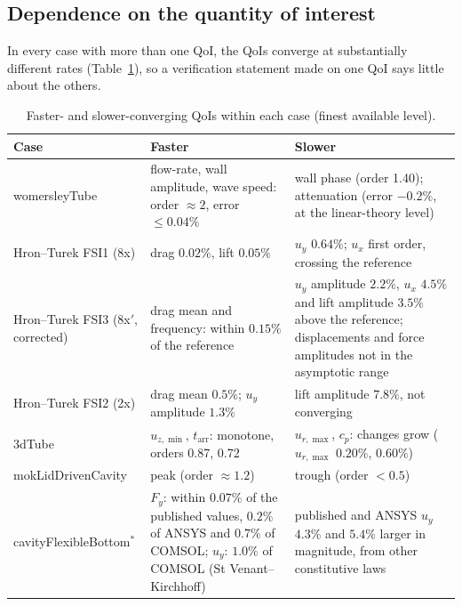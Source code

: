 \subsection{Dependence on the quantity of interest}\label{sec:qoi_dependence}

In every case with more than one QoI, the QoIs converge at substantially different rates (Table~\ref{tab:qoi_dependence}), so a verification statement made on one QoI says little about the others.

\begin{table}[htbp]
	\centering
	\footnotesize
	\setlength{\tabcolsep}{3pt}
	\caption{Faster- and slower-converging QoIs within each case (finest available level).}
	\label{tab:qoi_dependence}
	\begin{tabular}{p{2.8cm}p{5.4cm}p{5.4cm}}
		\toprule
		Case & Faster & Slower \\
		\midrule
		womersleyTube & flow-rate, wall amplitude, wave speed: order $\approx2$, error $\leq0.04\%$ & wall phase (order 1.40); attenuation (error $-0.2\%$, at the linear-theory level) \\
		Hron--Turek FSI1 (8x) & drag $0.02\%$, lift $0.05\%$ & $u_y$ $0.64\%$; $u_x$ first order, crossing the reference \\
		Hron--Turek FSI3 (8x$'$, corrected) & drag mean and frequency: within $0.15\%$ of the reference & $u_y$ amplitude $2.2\%$, $u_x$ $4.5\%$ and lift amplitude $3.5\%$ above the reference; displacements and force amplitudes not in the asymptotic range \\
		Hron--Turek FSI2 (2x) & drag mean $0.5\%$; $u_y$ amplitude $1.3\%$ & lift amplitude $7.8\%$, not converging \\
		3dTube & $u_{z,\min}$, $t_\mathrm{arr}$: monotone, orders 0.87, 0.72 & $u_{r,\max}$, $c_p$: changes grow ($u_{r,\max}$ $0.20\%$, $0.60\%$) \\
		mokLidDrivenCavity & peak (order $\approx1.2$) & trough (order $<0.5$) \\
		cavityFlexibleBottom$^\ast$ & $F_y$: within $0.07\%$ of the published values, $0.2\%$ of ANSYS and $0.7\%$ of COMSOL; $u_y$: $1.0\%$ of COMSOL (St Venant--Kirchhoff) & published and ANSYS $u_y$ $4.3\%$ and $5.4\%$ larger in magnitude, from other constitutive laws \\
				\bottomrule
	\end{tabular}
\end{table}

